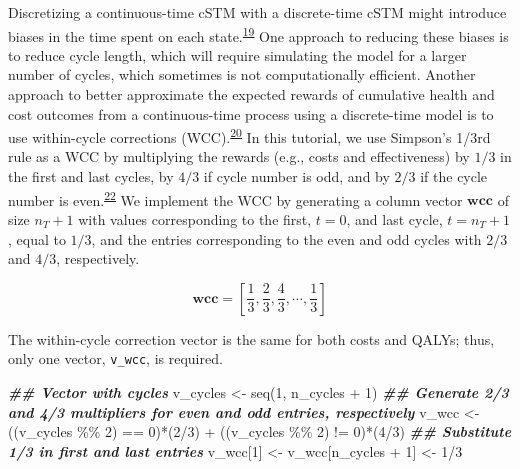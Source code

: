 \documentclass[
]{article}
\newenvironment{Shaded}{\begin{snugshade}}{\end{snugshade}}
\newcommand{\DecValTok}[1]{\textcolor[rgb]{0.00,0.00,0.81}{#1}}
\newcommand{\DocumentationTok}[1]{\textcolor[rgb]{0.56,0.35,0.01}{\textbf{\textit{#1}}}}
\newcommand{\FunctionTok}[1]{\textcolor[rgb]{0.00,0.00,0.00}{#1}}
\newcommand{\NormalTok}[1]{#1}
\newcommand{\OtherTok}[1]{\textcolor[rgb]{0.56,0.35,0.01}{#1}}
\newcommand{\SpecialCharTok}[1]{\textcolor[rgb]{0.00,0.00,0.00}{#1}}
\begin{document}
Discretizing a continuous-time cSTM with a discrete-time cSTM might introduce biases in the time spent on each state.\textsuperscript{\protect\hyperlink{ref-VanRosmalen2013}{19}} One approach to reducing these biases is to reduce cycle length, which will require simulating the model for a larger number of cycles, which sometimes is not computationally efficient. Another approach to better approximate the expected rewards of cumulative health and cost outcomes from a continuous-time process using a discrete-time model is to use within-cycle corrections (WCC).\textsuperscript{\protect\hyperlink{ref-Hunink2014}{20}} In this tutorial, we use Simpson's 1/3rd rule as a WCC by multiplying the rewards (e.g., costs and effectiveness) by \(1/3\) in the first and last cycles, by \(4/3\) if cycle number is odd, and by \(2/3\) if the cycle number is even.\textsuperscript{\protect\hyperlink{ref-Elbasha2016a}{22}} We implement the WCC by generating a column vector \(\mathbf{wcc}\) of size \(n_T+1\) with values corresponding to the first, \(t=0\), and last cycle, \(t= n_T + 1\), equal to \(1/3\), and the entries corresponding to the even and odd cycles with \(2/3\) and \(4/3\), respectively.

\[
  \mathbf{wcc} = \left[\frac{1}{3}, \frac{2}{3}, \frac{4}{3}, \cdots, \frac{1}{3}\right]
\]

The within-cycle correction vector is the same for both costs and QALYs; thus, only one vector, \texttt{v\_wcc}, is required.

\begin{Shaded}
\begin{Highlighting}[]
\DocumentationTok{\#\# Vector with cycles}
\NormalTok{v\_cycles }\OtherTok{\textless{}{-}} \FunctionTok{seq}\NormalTok{(}\DecValTok{1}\NormalTok{, n\_cycles }\SpecialCharTok{+} \DecValTok{1}\NormalTok{)}
\DocumentationTok{\#\# Generate 2/3 and 4/3 multipliers for even and odd entries, respectively}
\NormalTok{v\_wcc }\OtherTok{\textless{}{-}}\NormalTok{ ((v\_cycles }\SpecialCharTok{\%\%} \DecValTok{2}\NormalTok{) }\SpecialCharTok{==} \DecValTok{0}\NormalTok{)}\SpecialCharTok{*}\NormalTok{(}\DecValTok{2}\SpecialCharTok{/}\DecValTok{3}\NormalTok{) }\SpecialCharTok{+}\NormalTok{ ((v\_cycles }\SpecialCharTok{\%\%} \DecValTok{2}\NormalTok{) }\SpecialCharTok{!=} \DecValTok{0}\NormalTok{)}\SpecialCharTok{*}\NormalTok{(}\DecValTok{4}\SpecialCharTok{/}\DecValTok{3}\NormalTok{)}
\DocumentationTok{\#\# Substitute 1/3 in first and last entries}
\NormalTok{v\_wcc[}\DecValTok{1}\NormalTok{] }\OtherTok{\textless{}{-}}\NormalTok{ v\_wcc[n\_cycles }\SpecialCharTok{+} \DecValTok{1}\NormalTok{] }\OtherTok{\textless{}{-}} \DecValTok{1}\SpecialCharTok{/}\DecValTok{3}
\end{Highlighting}
\end{Shaded}
\end{document}
